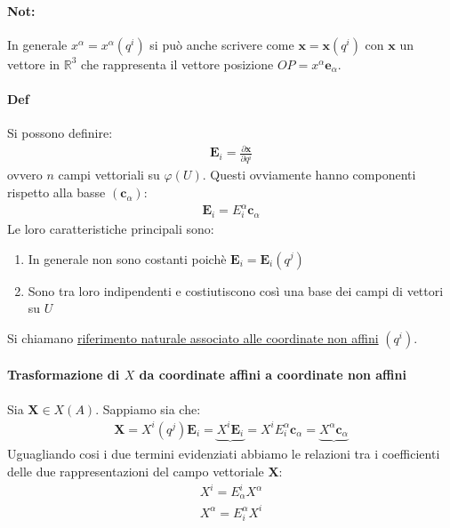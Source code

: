 \documentclass[10pt,a4paper]{book}
\begin{document}
\paragraph{Not:}In generale $x^\alpha=x^\alpha(q^i)$ si può anche scrivere come $\textbf{x}=\mathbf{x}(q^i)$ con $\mathbf{x}$ un vettore in $\mathbb{R}^3$ che rappresenta il vettore posizione $OP=x^\alpha \mathbf{e}_\alpha$.
\paragraph{Def} Si possono definire:
\begin{align*}
    \mathbf{E}_i=\frac{\partial \mathbf{x}}{\partial q^i}
\end{align*}
ovvero $n$ campi vettoriali su $\varphi(U)$. Questi ovviamente hanno componenti rispetto alla basse $(\mathbf{c}_\alpha)$:
\begin{align*}
    \mathbf{E}_i=E^\alpha_i\mathbf{c}_\alpha
\end{align*}
Le loro caratteristiche principali sono:
\begin{enumerate}
   \item In generale non sono costanti poichè $\mathbf{E}_i=\mathbf{E}_i(q^j)$
   \item Sono tra loro indipendenti e costiutiscono così una base dei campi di vettori su $U$
\end{enumerate}
Si chiamano \underline{riferimento naturale associato alle coordinate non affini} $(q^i)$.
\paragraph*{Trasformazione di $X$ da coordinate affini a coordinate non affini} Sia $\mathbf{X}\in X(A)$. Sappiamo sia che:
\begin{align*}
    \mathbf{X}=X^i(q^j)\mathbf{E}_i=\underbrace{X^i\mathbf{E}_i}=X^iE^\alpha_i\mathbf{c}_\alpha=\underbrace{X^\alpha\mathbf{c}_\alpha}
\end{align*}
Uguagliando cosi i due termini evidenziati abbiamo le relazioni tra i coefficienti delle due rappresentazioni del campo vettoriale $\mathbf{X}$:
\begin{align*}
    X^i=E^i_\alpha X^\alpha\\
    X^\alpha=E^\alpha_iX^i
\end{align*}
\end{document}
